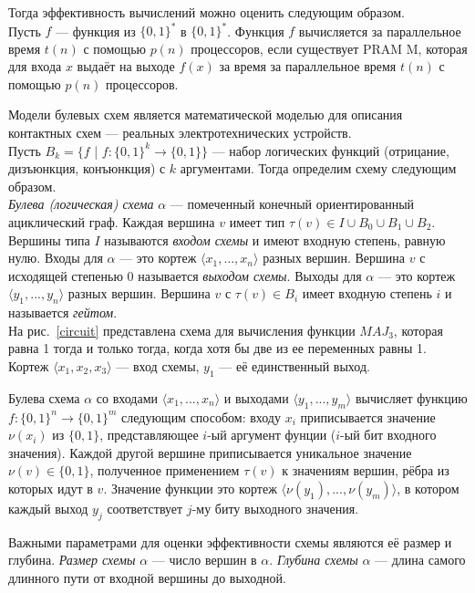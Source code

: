 \documentclass{spbau-diploma}
\begin{document}
Тогда эффективность вычислений можно оценить следующим образом.
\\Пусть  $f$ --- функция из $ {\{0, 1\}}^*$ в $ {\{0, 1\}}^*$. Функция $f$ вычисляется за параллельное время $t(n)$ с помощью $p(n)$ процессоров, если существует PRAM M, которая для входа $x$ выдаёт на выходе $f(x)$ за время за параллельное время $t(n)$ с помощью $p(n)$ процессоров.
\par
Модели булевых схем является математической моделью для описания контактных схем --- реальных электротехнических устройств. \\
Пусть $B_k = \{f$ | $f: {\{0,1\}}^k \to \{0, 1\}\}$ --- набор логических функций (отрицание, дизъюнкция, конъюнкция) с $k$ аргументами.
Тогда определим схему следующим образом. 
\\
\textit{Булева (логическая) схема} $\alpha$ --- помеченный конечный ориентированный ациклический граф. Каждая вершина $v$ имеет тип $\tau(v)  \in I \cup B_0 \cup B_1 \cup B_2$. Вершины типа $I$ называются \textit{входом схемы} и имеют входную степень, равную нулю. Входы для $\alpha$ --- это кортеж $\langle x_1, ..., x_n \rangle$ разных вершин. Вершина $v$ с исходящей степенью 0 называется \textit{выходом схемы}. Выходы для $\alpha$ --- это кортеж $\langle y_1, ..., y_n \rangle$ разных вершин. Вершина $v$ с $\tau(v) \in B_i$ имеет входную степень $i$ и называется \textit{гейтом}. 
\\
На рис.~\ref{circuit} представлена схема для вычисления функции ${MAJ}_3$, которая равна 1 тогда и только тогда, когда хотя бы две из ее переменных равны 1. Кортеж $\langle x_1, x_2, x_3 \rangle$ --- вход схемы, $ y_1$ --- её единственный  выход.
\par
Булева схема $\alpha$ со входами  $\langle x_1, ..., x_n \rangle$ и выходами $\langle y_1, ..., y_m \rangle$ вычисляет функцию $f: {\{0,1\}}^n \to {\{0, 1\}}^m$ следующим способом: входу $x_i$ приписывается значение $\nu(x_i)$ из $\{0, 1\}$, представляющее $i$-ый аргумент фунции ($i$-ый бит входного значения). Каждой другой вершине приписывается уникальное значение $\nu(v) \in \{0, 1\}$,  полученное применением $\tau(v)$ к значениям вершин, рёбра из которых идут в $v$. Значение функции это кортеж $\langle \nu(y_1), ..., \nu(y_m) \rangle$, в котором каждый выход $y_j$ соответствует $j$-му биту выходного значения. 
\par
Важными параметрами для оценки эффективности схемы являются её размер и глубина.
\textit{Размер схемы}  $\alpha$ --- число вершин в $\alpha$. \textit{Глубина схемы} $\alpha$ --- длина самого длинного пути от входной вершины до выходной. 
\end{document}
